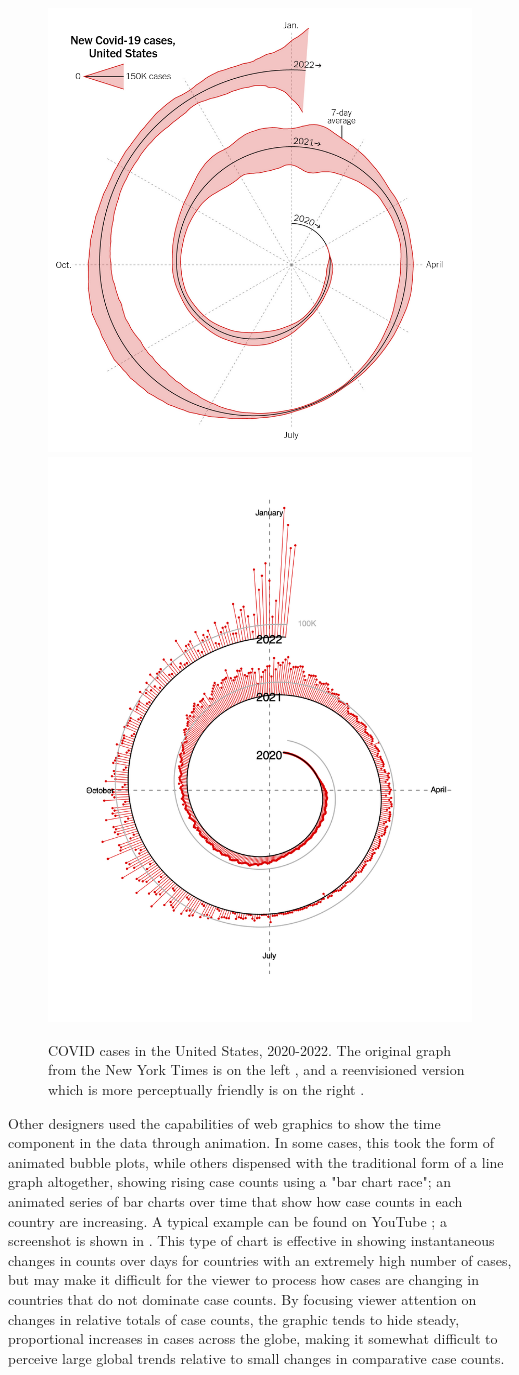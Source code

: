 \documentclass[article]{jdssv}\usepackage[]{graphicx}\usepackage[]{color}
\begin{document}
\begin{figure}\centering
\includegraphics[width=.45\linewidth]{nyt-spiral}\hfill\includegraphics[width=.45\linewidth]{spiral-rework}
\caption{COVID cases in the United States, 2020-2022. The original graph from the New York Times is on the left \citep{shamanOpinionHereWhen2022}, and a reenvisioned version which is more perceptually friendly is on the right \citep{shresthaCovidSpiral2022}.}
\label{fig:nyt-spiral}
\end{figure}

Other designers used the capabilities of web graphics to show the time component in the data through animation. In some cases, this took the form of animated bubble plots, while others dispensed with the traditional form of a line graph altogether, showing rising case counts using a "bar chart race"; an animated series of bar charts over time that show how case counts in each country are increasing. A typical example can be found on YouTube \citep{clockCoronavirusCasesBar2022}; a screenshot is shown in . This type of chart is effective in showing instantaneous changes in counts over days for countries with an extremely high number of cases, but may make it difficult for the viewer to process how cases are changing in countries that do not dominate case counts. By focusing viewer attention on changes in relative totals of case counts, the graphic tends to hide steady, proportional increases in cases across the globe, making it somewhat difficult to perceive large global trends relative to small changes in comparative case counts. 
\end{document}
